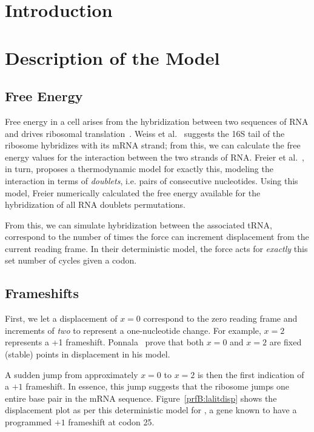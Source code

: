 \documentclass[12pt, draft]{article}
\numberwithin{equation}{section}
\begin{document}
\section{Introduction}

\section{Description of the Model}
\subsection{Free Energy}
\label{freeenergy}

Free energy in a cell arises from the hybridization between two
sequences of RNA and drives ribosomal translation~\cite{starmer}.
Weiss et al.~\cite{weiss} suggests the 16S tail of the ribosome hybridizes with its mRNA strand;
from this, we can calculate the free energy values for the interaction between the two strands of RNA.
Freier et al.~\cite{freier}, in turn, proposes a thermodynamic model for exactly this,
modeling the interaction in terms of \emph{doublets}, i.e. pairs of consecutive nucleotides.
Using this model, Freier numerically calculated the free energy available
for the hybridization of all RNA doublets permutations.

From this, we can simulate hybridization between the associated tRNA, correspond to the number
of times the force can increment displacement from the current reading frame.
In their deterministic model, the force acts for \emph{exactly} this set number of cycles given a codon.

\subsection{Frameshifts}


First, we let a displacement of $x = 0$ correspond to the zero reading frame and increments of
\emph{two} to represent a one-nucleotide change. For example, $x =2$ represents a +1 frameshift.
Ponnala~\cite{lalit:embs} prove that both $x = 0$ and $x = 2$ are fixed (stable) points in displacement in his model.

A sudden jump from approximately $x = 0$ to $x = 2$ is then the first indication of a $+1$ frameshift.
In essence, this jump suggests that the ribosome jumps one entire base pair in the mRNA sequence.
Figure~\ref{prfB:lalitdisp} shows the displacement plot as per this deterministic model for \prfB, 
a gene known to have a programmed $+1$ frameshift at codon 25.
\end{document}
